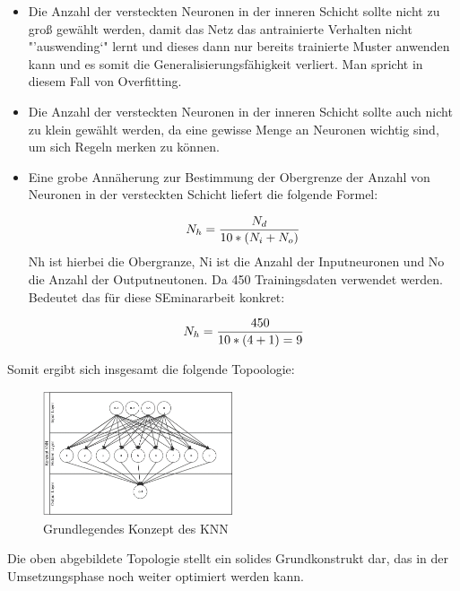 \begin{itemize}

\item Die Anzahl der versteckten Neuronen in der inneren Schicht sollte nicht zu groß gewählt werden, damit das Netz das antrainierte Verhalten nicht "'auswending`" lernt und dieses dann nur bereits trainierte Muster anwenden kann und es somit die Generalisierungsfähigkeit verliert. Man spricht in diesem Fall von Overfitting.

\item Die Anzahl der versteckten Neuronen in der inneren Schicht sollte auch nicht zu klein gewählt werden, da eine gewisse Menge an Neuronen wichtig sind, um sich Regeln merken zu können.

\item Eine grobe Annäherung zur Bestimmung der Obergrenze der Anzahl von Neuronen in der versteckten Schicht liefert die folgende Formel:

\begin{equation}\formelentry{Optimale Anzahl Neuronen in der versteckten Schicht}
  N_h = \frac{N_d}{10*(N_i+N_o)}
\end{equation}
Nh ist hierbei die Obergranze, Ni ist die Anzahl der Inputneuronen und No die Anzahl der Outputneutonen. Da 450 Trainingsdaten verwendet werden. Bedeutet das für diese SEminararbeit konkret:

\begin{equation}\formelentry{Optimale Anzahl Neuronen in der versteckten Schicht}
  N_h = \frac{450}{10*(4+1) = 9 }   
\end{equation}
\end{itemize}
 

Somit ergibt sich insgesamt die folgende Topoologie:

\begin{figure}[H]
\centering
		\includegraphics[width=0.5\textwidth]{KonzKNN.PNG}
	\caption{Grundlegendes Konzept des KNN}
	\label{fig:Grundlegendes Konzept des KNN}
\end{figure}


Die oben abgebildete Topologie stellt ein solides Grundkonstrukt dar, das in der Umsetzungsphase noch weiter optimiert werden kann.


